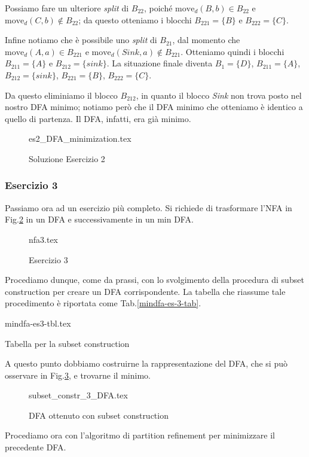 \documentclass[class=book, crop=false, oneside, 12pt]{standalone}
\begin{document}
Possiamo fare un ulteriore \emph{split} di \(B_{22}\), poiché \(\textrm{move}_{d}(B,b) \in B_{22} \) e \(\textrm{move}_{d}(C,b) \notin B_{22} \); da questo otteniamo i blocchi \(B_{221}=\{B\}\) e \(B_{222}=\{C\}\).

Infine notiamo che è possibile uno \emph{split} di \(B_{21}\), dal momento che \(\textrm{move}_{d}(A,a) \in B_{221} \) e \(\textrm{move}_{d}(Sink,a) \notin B_{221} \). Otteniamo quindi i blocchi \(B_{211}=\{A\}\) e \(B_{212}=\{sink\}\).
La situazione finale diventa \(B_{1}=\{D\}\), \(B_{211}=\{A\}\), \(B_{212}=\{sink\}\), \(B_{221}=\{B\}\), \(B_{222}=\{C\}\).

Da questo eliminiamo il blocco \(B_{212}\), in quanto il blocco \emph{Sink} non trova posto nel nostro DFA minimo; notiamo però che il DFA minimo che otteniamo è identico a quello di partenza. Il DFA, infatti, era già minimo.  

\begin{figure}[H]
	\centering
    {es2_DFA_minimization.tex}
	\caption{Soluzione Esercizio 2}
  \label{mindfa-es-2-sol}
\end{figure}

\subsubsection{Esercizio 3}
Passiamo ora ad un esercizio più completo. Si richiede di trasformare l'NFA in Fig.\ref{mindfa-es-3} in un DFA e successivamente in un min DFA.
\begin{figure}[H]
	\centering
  {nfa3.tex}
	\caption{Esercizio 3}
	\label{mindfa-es-3}
\end{figure}
Procediamo dunque, come da prassi, con lo svolgimento della procedura di subset construction per creare un DFA corrispondente. La tabella che riassume tale procedimento è riportata come Tab.\ref{mindfa-es-3-tab}.
\begin{table}[H]
	\centering
	{mindfa-es3-tbl.tex}
	\caption{Tabella per la subset construction}
	\label{mindfa-es-3-tab}
\end{table}
A questo punto dobbiamo costruirne la rappresentazione del DFA, che si può osservare in Fig.\ref{dfa-sc-es-3-mindfa}, e trovarne il minimo.
\begin{figure}
	\centering
    {subset_constr_3_DFA.tex}
	\caption{DFA ottenuto con subset construction}
	\label{dfa-sc-es-3-mindfa}
\end{figure}
Procediamo ora con l'algoritmo di partition refinement per minimizzare il precedente DFA.
\end{document}
